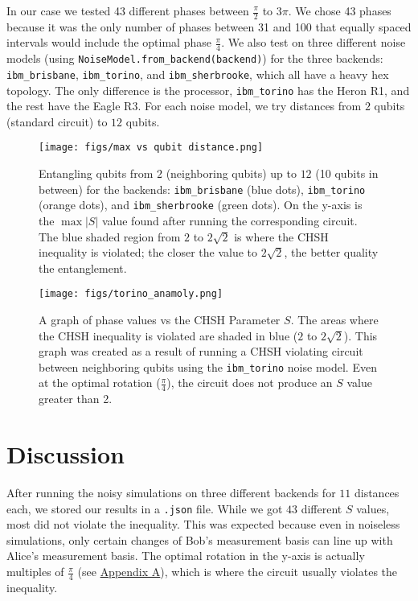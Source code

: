 \documentclass[a4paper, onecolumn, 11pt, titlepage]{quantumarticle}
\begin{document}
In our case we tested 43 different phases between $\frac{\pi}{2}$ to $3\pi$. We chose 43 phases because it was the only number of phases between 31 and 100 that equally spaced intervals would include the optimal phase $\frac{\pi}{4}$. We also test on three different noise models (using \verb|NoiseModel.from_backend(backend)|) for the three backends: \verb|ibm_brisbane|, \verb|ibm_torino|, and \verb|ibm_sherbrooke|, which all have a heavy hex topology. The only difference is the processor, \verb|ibm_torino| has the Heron R1, and the rest have the Eagle R3. For each noise model, we try distances from $2$ qubits (standard circuit) to $12$ qubits.



\begin{figure}
    \centering
    \texttt{[image: figs/max vs qubit distance.png]}
    \caption{Entangling qubits from $2$ (neighboring qubits) up to $12$ (10 qubits in between) for the backends: \texttt{ibm\_brisbane} (blue dots), \texttt{ibm\_torino} (orange dots), and \texttt{ibm\_sherbrooke} (green dots). On the y-axis is the $\max|S|$ value found after running the corresponding circuit. The blue shaded region from $2$ to $2\sqrt{2}$ is where the CHSH inequality is violated; the closer the value to $2\sqrt{2}$, the better quality the entanglement.}
    \label{fig:all}
\end{figure}

\begin{figure}
    \centering
    \texttt{[image: figs/torino\_anamoly.png]}
    \caption{A graph of phase values vs the CHSH Parameter $S$. The areas where the CHSH inequality is violated are shaded in blue ($2$ to $2\sqrt{2}$). This graph was created as a result of running a CHSH violating circuit between neighboring qubits using the \texttt{ibm\_torino} noise model. Even at the optimal rotation ($\frac{\pi}{4}$), the circuit does not produce an $S$ value greater than 2.}
    \label{fig:torino}
\end{figure}

\section{Discussion}
After running the noisy simulations on three different backends for $11$ distances each, we stored our results in a \verb|.json| file. While we got $43$ different $S$ values, most did not violate the inequality. This was expected because even in noiseless simulations, only certain changes of Bob’s measurement basis can line up with Alice’s measurement basis. The optimal rotation in the y-axis is actually multiples of $\frac{\pi}{4}$ (see \hyperref[firstappendix]{Appendix A}), which is where the circuit usually violates the inequality. 
\end{document}
